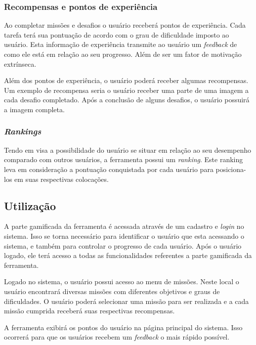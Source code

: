 \documentclass[
	12pt,				%
	oneside,			%
	a4paper,			%
	english,			%
	french,				%
	spanish,			%
	brazil,				%
	]{abntex2}
\begin{document}
\subsubsection{Recompensas e pontos de experiência}

Ao completar missões e desafios o usuário receberá pontos de experiência. Cada tarefa terá sua pontuação de acordo com o grau de dificuldade imposto ao usuário. Esta informação de experiência transmite ao usuário um \textit{feedback} de como ele está em relação ao seu progresso. Além de ser um fator de motivação extrínseca. 

Além dos pontos de experiência, o usuário poderá receber algumas recompensas. Um exemplo de recompensa seria o usuário receber uma parte de uma imagem a cada desafio completado. Após a conclusão de alguns desafios, o usuário possuirá a imagem completa.

\subsubsection{\textit{Rankings}}

Tendo em visa a possibilidade do usuário se situar em relação ao seu desempenho comparado com outros usuários, a ferramenta possui um \textit{ranking}. Este ranking leva em consideração a pontuação conquistada por cada usuário para posiciona-los em suas respectivas colocações.

\subsection{Utilização}

A parte gamificada da ferramenta é acessada através de um cadastro e \textit{login} no sistema. Isso se torna necessário para identificar o usuário que esta acessando o sistema, e também para controlar o progresso de cada usuário. Após o usuário logado, ele terá acesso a todas as funcionalidades referentes a parte gamificada da ferramenta.

Logado no sistema, o usuário possui acesso ao menu de missões. Neste local o usuário encontrará diversas missões com diferentes objetivos e graus de dificuldades. O usuário poderá selecionar uma missão para ser realizada e a cada missão cumprida receberá suas respectivas recompensas.

A ferramenta exibirá os pontos do usuário na página principal do sistema. Isso ocorrerá para que os usuários recebem um \textit{feedback} o mais rápido possível.
\end{document}
